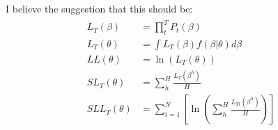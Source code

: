 \documentclass[12pt,a4paper]{article}\usepackage[]{graphicx}\usepackage[]{color}
\begin{document}
I believe the suggestion that this should be:
\begin{align}
	\begin{split}
		L_{T}(\beta)       &= \prod_t^T P_{t}(\beta)                     \\
		L_{T}(\theta)      &= \int L_{T}(\beta) f(\beta | \theta) d\beta \\
		{LL}(\theta)       &= \ln({L}_{T}(\theta))                       \\
		{SL}_{T}(\theta)   &= \sum_h^H \frac{L_{T}(\beta^h)}{H}          \\
		{SLL}_{T}(\theta)  &= \sum_{i=1}^N \left [ \ln \left ( \sum_h^H \frac{L_{Ti}(\beta^h)}{H} \right ) \right ]
	\end{split}
\end{align}
\end{document}
